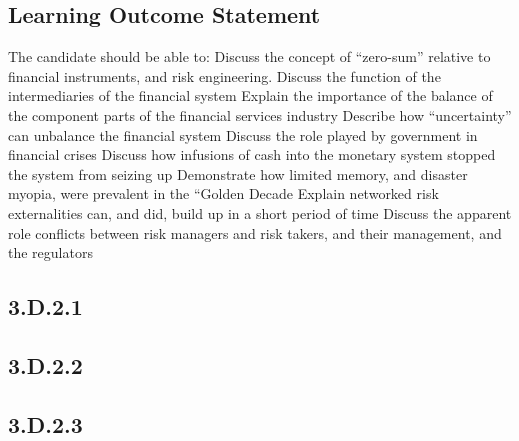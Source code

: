 \documentclass[12pt]{article}
\begin{document}
\subsection*{Learning Outcome Statement}
The candidate should be able to:
 Discuss the concept of “zero-sum” relative to financial instruments, and risk engineering.
 Discuss the function of the intermediaries of the financial system
 Explain the importance of the balance of the component parts of the financial services industry
 Describe how “uncertainty” can unbalance the financial system
 Discuss the role played by government in financial crises 
 Discuss how infusions of cash into the monetary system stopped the system from seizing up
 Demonstrate how limited memory, and disaster myopia, were prevalent in the “Golden Decade
 Explain networked risk externalities can, and did, build up in a short period of time
 Discuss the apparent role conflicts between risk managers and risk takers, and their management, and the regulators
 


\subsection{3.D.2.1}
\subsection{3.D.2.2}
\subsection{3.D.2.3}
\end{document}
